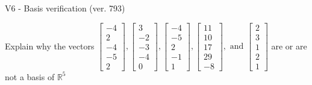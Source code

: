 \begin{exercise}
  \begin{exerciseTitle}V6 - Basis verification (ver. 793)\end{exerciseTitle}
  \begin{exerciseStatement}
    Explain why the vectors \(\left[\begin{array}{r}
-4 \\
2 \\
-4 \\
-5 \\
2
\end{array}\right] , \left[\begin{array}{r}
3 \\
-2 \\
-3 \\
-4 \\
0
\end{array}\right] , \left[\begin{array}{r}
-4 \\
-5 \\
2 \\
-1 \\
1
\end{array}\right] , \left[\begin{array}{r}
11 \\
10 \\
17 \\
29 \\
-8
\end{array}\right] , \text{ and } \left[\begin{array}{r}
2 \\
3 \\
1 \\
2 \\
1
\end{array}\right]\) are or are not a basis of \(\mathbb{R}^5\)	



\end{exerciseStatement}
\end{exercise}

